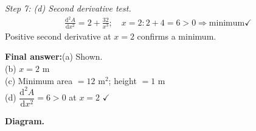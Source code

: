 \documentclass[11pt]{article}
\begin{document}
\textit{Step 7: (d) Second derivative test.}
\[\begin{gathered}
\frac{\mathrm{d}^2A}{\mathrm{d}x^2} = 2 + \frac{32}{x^3}; \quad x=2: 2 + 4 = 6 > 0 \Rightarrow \text{minimum} \checkmark
\end{gathered}\]
Positive second derivative at \( x = 2 \) confirms a minimum.

\begin{answerbox}
\textbf{Final answer:}\quad (a) Shown. \\[3pt]  (b) \(\displaystyle  x = 2 \) m \\[3pt]  (c) Minimum area \(\displaystyle  = 12 \text{ m}^2 \); height \(\displaystyle  = 1 \) m \\[3pt]  (d) \(\displaystyle  \dfrac{\mathrm{d}^2A}{\mathrm{d}x^2} = 6 > 0 \) at \(\displaystyle  x = 2 \) $\checkmark$
\end{answerbox}
\textbf{Diagram.}
\end{document}
